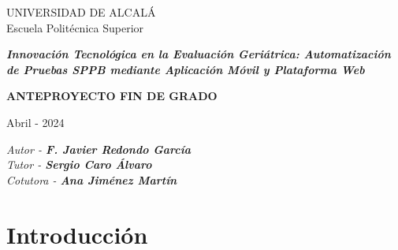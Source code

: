 \documentclass[12pt,oneside,a4paper]{article}
\begin{document}

\thispagestyle{empty}

\begin{center}

\begin{large}
UNIVERSIDAD DE ALCALÁ\\
Escuela Politécnica Superior\\
\end{large}
\vspace{4cm}


\begin{Huge}\textbf{\textit{Innovación Tecnológica en la Evaluación Geriátrica: Automatización de Pruebas SPPB mediante Aplicación Móvil y Plataforma Web}}\end{Huge}

\vspace{1cm}


\textbf{ANTEPROYECTO FIN DE GRADO}

\vfill
\hline
Abril - 2024

\end{center}

\begin{flushright}
\textit{Autor - \textbf{F. Javier Redondo García}} \\
\textit{Tutor - \textbf{Sergio Caro Álvaro}} \\
\textit{Cotutora - \textbf{Ana Jiménez Martín}}

\end{flushright}


\newpage
\tableofcontents

\newpage
\section{Introducción}
\hline
\end{document}

